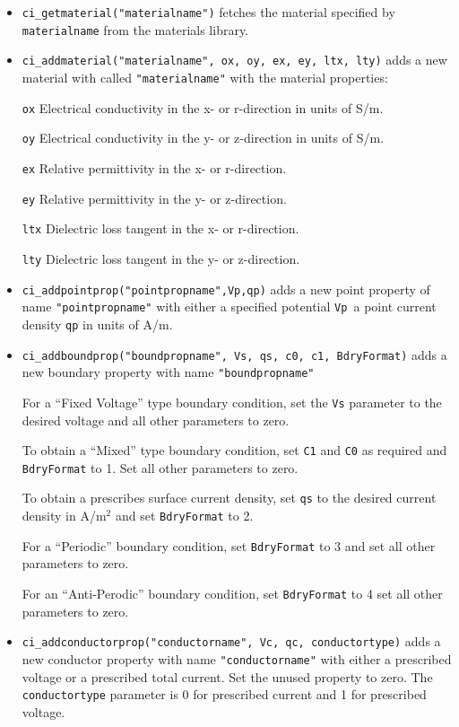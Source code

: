 \begin{itemize}
\item \texttt{ci\_getmaterial("materialname")} fetches the material specified by \texttt{materialname}
from the materials library.

\item \texttt{ci\_addmaterial("materialname", ox, oy, ex, ey, ltx, lty)} adds a new material with
called \texttt{"materialname"} with the material properties:

\texttt{ox} Electrical conductivity in the x- or r-direction in units of S/m.

\texttt{oy} Electrical conductivity in the y- or z-direction in units of S/m.

\texttt{ex} Relative permittivity in the x- or r-direction.

\texttt{ey} Relative permittivity in the y- or z-direction.

\texttt{ltx} Dielectric loss tangent in the x- or r-direction.

\texttt{lty} Dielectric loss tangent in the y- or z-direction.

\item \texttt{ci\_addpointprop("pointpropname",Vp,qp)} adds a new point property of
name \texttt{"pointpropname"} with either a specified potential
\texttt{Vp }a point current density \texttt{qp} in units of A/m.

\item \texttt{ci\_addboundprop("boundpropname", Vs, qs, c0, c1, BdryFormat)} adds a
new boundary property with name \texttt{"boundpropname"}

For a ``Fixed Voltage'' type boundary condition, set the
\texttt{Vs} parameter to the desired voltage and all other
parameters to zero.

To obtain a ``Mixed'' type boundary condition, set \texttt{C1} and
\texttt{C0} as required and \texttt{BdryFormat} to 1. Set all other
parameters to zero.

To obtain a prescribes surface current density, set \texttt{qs} to
the desired current density in A/m$^{2}$ and set \texttt{BdryFormat}
to 2.

For a ``Periodic'' boundary condition, set \texttt{BdryFormat} to 3
and set all other parameters to zero.

For an ``Anti-Perodic'' boundary condition, set \texttt{BdryFormat}
to 4 set all other parameters to zero.

\item \texttt{ci\_addconductorprop("conductorname", Vc, qc, conductortype)} adds a new
conductor property with name \texttt{"conductorname"} with either a
prescribed voltage or a prescribed total current. Set the unused
property to zero. The \texttt{conductortype} parameter is 0 for
prescribed current and 1 for prescribed voltage.


\end{itemize}
